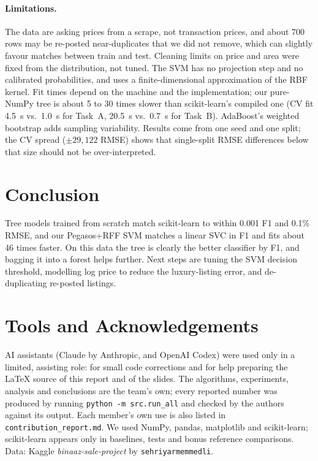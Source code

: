 \documentclass[10pt,twocolumn,a4paper]{article}
\begin{document}
\paragraph{Limitations.}
The data are asking prices from a scrape, not transaction prices, and about
700 rows may be re-posted near-duplicates that we did not remove, which can
slightly favour matches between train and test. Cleaning limits on price and
area were fixed from the distribution, not tuned. The SVM has no projection
step and no calibrated probabilities, and uses a finite-dimensional
approximation of the RBF kernel. Fit times depend on the machine and the
implementation; our pure-NumPy tree is about 5 to 30 times slower than
scikit-learn's compiled one (CV fit 4.5~s vs.\ 1.0~s for Task~A, 20.5~s vs.\ 0.7~s for Task~B). AdaBoost's weighted bootstrap adds sampling
variability. Results come from one seed and one split; the CV spread
($\pm29{,}122$ RMSE) shows that single-split RMSE differences below that size
should not be over-interpreted.

\section{Conclusion}
Tree models trained from scratch match scikit-learn to within 0.001 F1 and
0.1\% RMSE, and our Pegasos+RFF SVM matches a linear SVC in F1 and fits about 46 times faster. On this data the tree is clearly the better classifier by F1,
and bagging it into a forest helps further. Next steps are tuning the SVM
decision threshold, modelling log price to reduce the luxury-listing error,
and de-duplicating re-posted listings.

\section*{Tools and Acknowledgements}
AI assistants (Claude by Anthropic, and OpenAI Codex) were used only in a
limited, assisting role: for small code corrections and for help preparing the
\LaTeX{} source of this report and of the slides. The algorithms, experiments,
analysis and conclusions are the team's own; every reported number was
produced by running \texttt{python -m src.run\_all} and checked by the
authors against its output. Each member's own use is also listed in
\texttt{contribution\_report.md}.
We used NumPy, pandas, matplotlib and scikit-learn; scikit-learn appears only in
baselines, tests and bonus reference comparisons. Data: Kaggle
\emph{binaaz-sale-project} by \texttt{sehriyarmemmedli}.
\end{document}
